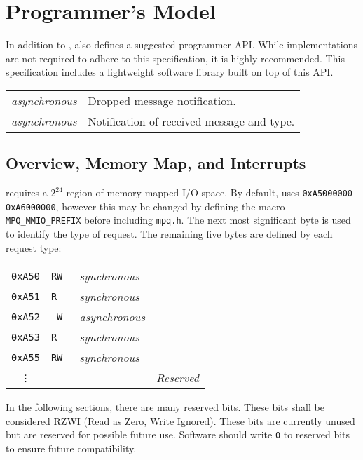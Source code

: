 \section{\proto Programmer's Model}
\label{sec:programmer}

In addition to \proto, \bus also defines a suggested programmer API. While
\proto implementations are not required to adhere to this specification, it is
highly recommended. This specification includes a lightweight software library
built on top of this API.

\begin{tabular}{l l}
  {\em asynchronous} & Dropped message notification. \\
  {\em asynchronous} & Notification of received message and type. \\
\end{tabular}

\subsection{Overview, Memory Map, and Interrupts}
\proto requires a $2^{24}$ region of memory mapped I/O space. By default,
\proto uses {\tt 0xA5000000-0xA6000000}, however this may be changed by
defining the macro {\tt MPQ\_MMIO\_PREFIX} before including {\tt mpq.h}.
The next most significant byte is used to identify the type of request. The
remaining five bytes are defined by each request type:

\begin{tabular}{ c|c|l|l }
  {\tt 0xA50}  & \tt RW & {\em  synchronous} & \nameref{reg-conf} \\
  {\tt 0xA51}  & \tt R~ & {\em  synchronous} & \nameref{reg-int} \\
  {\tt 0xA52}  & \tt ~W & {\em asynchronous} & \nameref{reg-tx-multi} \\
  {\tt 0xA53}  & \tt R~ & {\em  synchronous} & \nameref{reg-tx-result} \\
  {\tt 0xA55}  & \tt RW & {\em  synchronous} & \nameref{reg-rx-multi} \\
  {\tt \vdots} & \tt ~~ &                    & \em Reserved \\
\end{tabular}

In the following sections, there are many reserved bits. These bits shall be
considered RZWI (Read as Zero, Write Ignored). These bits are currently
unused but are reserved for possible future use. Software should write {\tt 0}
to reserved bits to ensure future compatibility.

